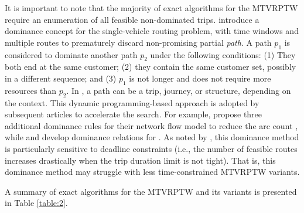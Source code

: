 It is important to note that the majority of exact algorithms for the MTVRPTW require an enumeration of all feasible non-dominated trips.  \cite{azi2007exact} introduce a dominance concept for the single-vehicle routing problem, with time windows and multiple routes to prematurely discard non-promising partial \textit{path}.  A path $p_1$ is considered to dominate another path $p_2$ under the following conditions: (1) They both end at the same customer; (2) they contain the same customer set, possibly in a different sequence; and (3) $p_1$ is not longer and does not require more resources than $p_2$.  In \cite{azi2007exact}, a path can be a trip, journey, or structure, depending on the context.  This dynamic programming-based approach is adopted by subsequent articles to accelerate the search.  For example, \cite{macedo2011solving} propose three additional dominance rules for their network flow model to reduce the arc count , while \cite{hernandez2016branch} and \cite{christiansen2017operational} develop  dominance relations for .  As noted by \cite{azi2007exact}, this dominance method is particularly sensitive to deadline constraints (i.e., the number of feasible routes increases drastically when the trip duration limit is not tight).  That is, this dominance method may struggle with less time-constrained MTVRPTW variants.
\newline

A summary of exact algorithms for the MTVRPTW and its variants is presented in Table \ref{table:2}.

